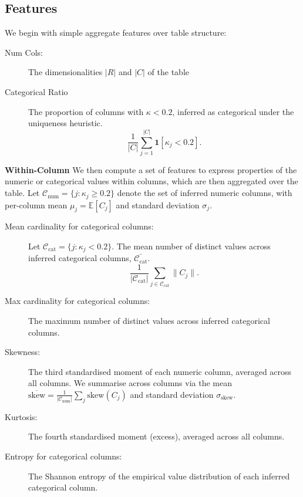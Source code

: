 \documentclass{article}
\begin{document}
\subsection{Features}
\label{sec:features}

We begin with simple aggregate features over table structure:
\begin{description}
    \item[Num Cols:] The dimensionalities $|R|$ and $|C|$ of the table

    \item[Categorical Ratio] The proportion of columns with $\kappa < 0.2$, inferred as categorical under the uniqueness heuristic.
    \begin{equation}
        \frac{1}{|C|}\sum_{j=1}^{|C|} \mathbf{1}\!\left[\kappa_j < 0.2\right].
    \end{equation}
\end{description}



\textbf{Within-Column}
We then compute a set of features to express properties of the numeric or categorical values within columns, which are then aggregated over the table.
Let $\mathcal{C}_{\text{num}} = \{j : \kappa_j \geq 0.2\}$ denote the set of inferred numeric columns, with per-column mean $\mu_j = \mathbb{E}[C_j]$ and standard deviation $\sigma_j$.

\begin{description}
    \item[Mean cardinality for categorical columns:] Let $\mathcal{C}_{\text{cat}} = \{j : \kappa_j < 0.2\}$. The mean number of distinct values across inferred categorical columns, $\bar{\mathcal{C}_{\text{cat}}}$.
    \begin{equation}
        \frac{1}{|\mathcal{C}_{\text{cat}}|} \sum_{j \in \mathcal{C}_{\text{cat}}} \|C_j\|.
    \end{equation}

    \item[Max cardinality for categorical columns:] The maximum number of distinct values across inferred categorical columns.

    \item[Skewness:] The third standardised moment of each numeric column, averaged across all columns. 
    We summarise across columns via the mean $\overline{\text{skew}} = \frac{1}{|\mathcal{C}_{\text{num}}|}\sum_j \text{skew}(C_j)$ and standard deviation $\sigma_{\text{skew}}$.

    \item[Kurtosis:] The fourth standardised moment (excess), averaged across all columns.

    \item[Entropy for categorical columns:] The Shannon entropy of the empirical value distribution of each inferred categorical column.
\end{description}
\end{document}
